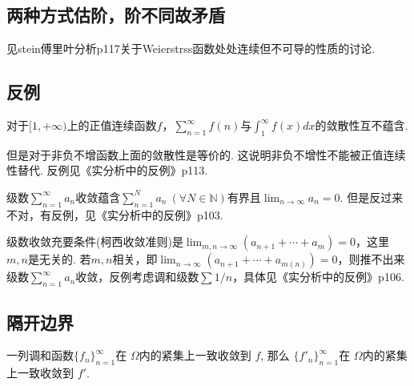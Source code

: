 \subsection{两种方式估阶，阶不同故矛盾}

\begin{note}
    见stein傅里叶分析p117关于Weierstrss函数处处连续但不可导的性质的讨论.
\end{note}

\subsection{反例}

对于$[1,+\infty)$上的正值连续函数$f$，$\sum_{n=1}^{\infty}f(n)$与$\int_{1}^{\infty}f(x)dx$的敛散性互不蕴含.

\begin{note}
    但是对于非负不增函数上面的敛散性是等价的. 这说明非负不增性不能被正值连续性替代. 反例见《实分析中的反例》p113.
\end{note}

级数$\sum_{n=1}^{\infty}a_n$收敛蕴含$\sum_{n=1}^{N}a_n\ (\forall N\in \mathbb{N})$有界且$\lim_{n\to \infty}a_n=0$. 但是反过来不对，有反例，见《实分析中的反例》p103.

级数收敛充要条件(柯西收敛准则)是$\lim_{m,n\to \infty}(a_{n+1}+\cdots+a_{m})=0$，这里$m,n$是无关的. 若$m,n$相关，即$\lim_{n\to \infty}(a_{n+1}+\cdots+a_{m(n)})=0$，则推不出来级数$\sum_{n=1}^{\infty}a_n$收敛，反例考虑调和级数$\sum 1/n$，具体见《实分析中的反例》p106.


\subsection{隔开边界}

\begin{theorem}[解析函数序列收敛性]\label{ }
    一列调和函数$\displaystyle \{f_n\}_{n=1}^\infty$在 $\displaystyle \Omega$内的紧集上一致收敛到 $\displaystyle f$, 那么 $\displaystyle \{f'_n\}_{n=1}^\infty$在 $\displaystyle \Omega$内的紧集上一致收敛到 $\displaystyle f'$.
\end{theorem}

